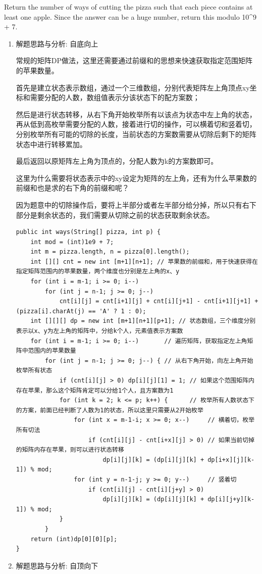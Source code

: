 \documentclass[9pt, b5paaper]{book}
\begin{document}
Return the number of ways of cutting the pizza such that each piece contains at least one apple. Since the answer can be a huge number, return this modulo 10\^{}9 + 7.
\begin{enumerate}
\item 解题思路与分析: 自底向上
\label{sec-1-1-8-1}

常规的矩阵DP做法，这里还需要通过前缀和的思想来快速获取指定范围矩阵的苹果数量。

首先是建立状态表示数组，通过一个三维数组，分别代表矩阵左上角顶点xy坐标和需要分配的人数，数组值表示分该状态下的配方案数；

然后是进行状态转移，从右下角开始枚举所有以该点为状态中左上角的状态，再从低到高枚举需要分配的人数，接着进行切的操作，可以横着切和竖着切，分别枚举所有可能的切除的长度，当前状态的方案数需要从切除后剩下的矩阵状态中进行转移累加。

最后返回以原矩阵左上角为顶点的，分配人数为k的方案数即可。

这里为什么需要将状态表示中的xy设定为矩阵的左上角，还有为什么苹果数的前缀和也是求的右下角的前缀和呢？

因为题意中的切除操作后，要将上半部分或者左半部分给分掉，所以只有右下部分是剩余状态的，我们需要从切除之前的状态获取剩余状态。

\begin{verbatim}
public int ways(String[] pizza, int p) {
    int mod = (int)1e9 + 7;
    int m = pizza.length, n = pizza[0].length();
    int [][] cnt = new int [m+1][n+1]; // 苹果数的前缀和，用于快速获得在指定矩阵范围内的苹果数量，两个维度也分别是左上角的x、y
    for (int i = m-1; i >= 0; i--) 
        for (int j = n-1; j >= 0; j--) 
            cnt[i][j] = cnt[i+1][j] + cnt[i][j+1] - cnt[i+1][j+1] + (pizza[i].charAt(j) == 'A' ? 1 : 0);
    int [][][] dp = new int [m+1][n+1][p+1]; // 状态数组，三个维度分别表示以x、y为左上角的矩阵中，分给k个人，元素值表示方案数
    for (int i = m-1; i >= 0; i--)       // 遍历矩阵，获取指定左上角矩阵中范围内的苹果数量
        for (int j = n-1; j >= 0; j--) { // 从右下角开始，向左上角开始枚举所有状态
            if (cnt[i][j] > 0) dp[i][j][1] = 1; // 如果这个范围矩阵内存在苹果，那么这个矩阵肯定可以分给1个人，且方案数为1
            for (int k = 2; k <= p; k++) {      // 枚举所有人数状态下的方案，前面已经判断了人数为1的状态，所以这里只需要从2开始枚举
                for (int x = m-1-i; x >= 0; x--)     // 横着切，枚举所有切法
                    if (cnt[i][j] - cnt[i+x][j] > 0) // 如果当前切掉的矩阵内存在苹果，则可以进行状态转移
                        dp[i][j][k] = (dp[i][j][k] + dp[i+x][j][k-1]) % mod;
                for (int y = n-1-j; y >= 0; y--)     // 竖着切
                    if (cnt[i][j] - cnt[i][j+y] > 0)
                        dp[i][j][k] = (dp[i][j][k] + dp[i][j+y][k-1]) % mod;
            }
        }
    return (int)dp[0][0][p];
}
\end{verbatim}
\item 解题思路与分析: 自顶向下
\label{sec-1-1-8-2}


\end{enumerate}
\end{document}
